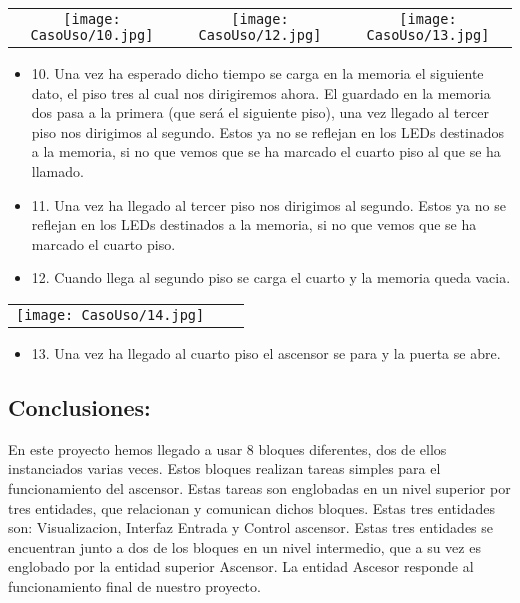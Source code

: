 	\begin{table}[H]
	\centering
	\begin{tabular}{ccc}
		 \texttt{[image: CasoUso/10.jpg]}  &
		 \texttt{[image: CasoUso/12.jpg]}   &
		 \texttt{[image: CasoUso/13.jpg]}  \\ 
	\end{tabular}
	\end{table}
	\begin{itemize}
	    \item 10.  Una vez ha esperado dicho tiempo se carga en la memoria el siguiente dato, el piso tres al cual nos dirigiremos ahora. El guardado en la memoria dos pasa a la primera (que será el siguiente piso), una vez llegado al tercer piso nos dirigimos al segundo. Estos ya no se reflejan en los LEDs destinados a la memoria, si no que vemos que se ha marcado el cuarto piso al que se ha llamado.
	    \item 11.  Una vez ha llegado al tercer piso nos dirigimos al segundo. Estos ya no se reflejan en los LEDs destinados a la memoria, si no que vemos que se ha marcado el cuarto piso.
	    \item 12. Cuando llega al segundo piso se carga el cuarto y la memoria queda vacia.
	\end{itemize}
	
	\begin{table}[H]
	\centering
	\begin{tabular}{ccc}
		 \texttt{[image: CasoUso/14.jpg]}   &  &  \\
	\end{tabular}
	\end{table}
	
	\begin{itemize}
	    \item 13. Una vez ha llegado al cuarto piso el ascensor se para y la puerta se abre.
	\end{itemize}

\subsection{Conclusiones:}
	En este proyecto hemos llegado a usar 8 bloques diferentes, dos de ellos instanciados varias veces. Estos bloques realizan tareas simples para el funcionamiento del ascensor. Estas tareas son englobadas en un nivel superior por tres entidades, que relacionan y comunican dichos bloques. Estas tres entidades son: Visualizacion, Interfaz Entrada y Control ascensor. Estas tres entidades se encuentran junto a dos de los bloques en un nivel intermedio, que a su vez es englobado por la entidad superior Ascensor. La entidad Ascesor responde al funcionamiento final de nuestro proyecto. \\ 

